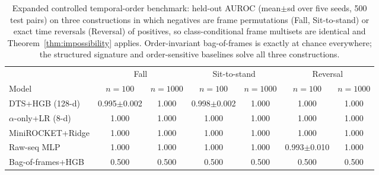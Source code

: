 \begin{table}[t]
\centering
\small
\setlength{\tabcolsep}{2.6pt}
\begin{tabular}{lcccccc}
\toprule
 & \multicolumn{2}{c}{Fall} & \multicolumn{2}{c}{Sit-to-stand} & \multicolumn{2}{c}{Reversal} \\
\cmidrule(lr){2-3}\cmidrule(lr){4-5}\cmidrule(lr){6-7}
Model & $n{=}100$ & $n{=}1000$ & $n{=}100$ & $n{=}1000$ & $n{=}100$ & $n{=}1000$ \\
\midrule
DTS+HGB (128-d) & 0.995{\scriptsize$\pm$0.002} & 1.000 & 0.998{\scriptsize$\pm$0.002} & 1.000 & 1.000 & 1.000 \\
$\alpha$-only+LR (8-d) & 1.000 & 1.000 & 1.000 & 1.000 & 1.000 & 1.000 \\
MiniROCKET+Ridge & 1.000 & 1.000 & 1.000 & 1.000 & 1.000 & 1.000 \\
Raw-seq MLP & 1.000 & 1.000 & 1.000 & 1.000 & 0.993{\scriptsize$\pm$0.010} & 1.000 \\
Bag-of-frames+HGB & 0.500 & 0.500 & 0.500 & 0.500 & 0.500 & 0.500 \\
\bottomrule
\end{tabular}
\caption{Expanded controlled temporal-order benchmark: held-out AUROC (mean$\pm$sd over five seeds, 500 test pairs) on three constructions in which negatives are frame permutations (Fall, Sit-to-stand) or exact time reversals (Reversal) of positives, so class-conditional frame multisets are identical and Theorem~\ref{thm:impossibility} applies. Order-invariant bag-of-frames is exactly at chance everywhere; the structured signature and order-sensitive baselines solve all three constructions.}
\label{tab:bench}
\end{table}

